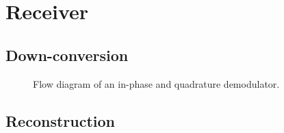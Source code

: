 \section{Receiver}


\subsection{Down-conversion}

\begin{figure}[htb]
	\centering
	
	\caption{Flow diagram of an in-phase and quadrature demodulator.}
\end{figure}

\subsection{Reconstruction}
